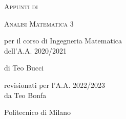 \documentclass[10pt,a4paper,twoside]{book}
\begin{document}
\frontmatter

\pagestyle{empty}


\hypertarget{mytitlepage}{} %

\vspace*{\fill}

\begin{center}
	{\large \textsc{Appunti di}}\\
	
	\vspace*{0.4cm}
	
	{\Huge \textsc{Analisi Matematica 3}}\\
	
	\vspace*{1cm}
	
	{\large per il corso di Ingegneria Matematica}\\
	\vspace*{0.2cm}
	{\large dell'A.A. 2020/2021}\\

	\vspace*{0.4cm}

	{\large di Teo Bucci}\\
	
	\vspace*{0.4cm}
	
	{\large revisionati per l'A.A. 2022/2023}\\
	\vspace*{0.2cm}
	{\large da Teo Bonfa}\\
	
	\vspace*{1cm}

	Politecnico di Milano
\end{center}
\vspace*{\fill}
\clearpage


\hypertarget{mycopyright}{} %

\clearpage


% 


\cleardoublepage
\pagestyle{toc}
\hypertarget{mytoc}{} %
\bookmark[dest=mytoc,level=chapter]{\contentsname} %
\tableofcontents
\cleardoublepage


\pagestyle{fancy}
\mainmatter

 \cleardoublepage

\end{document}
